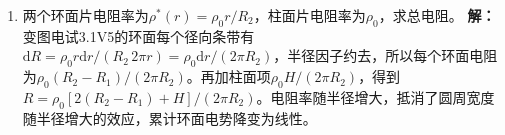 \documentclass[UTF8,fontset=fandol,a4paper,11pt]{ctexart}
\begin{document}
\begin{enumerate}
\item 两个环面片电阻率为$\rho^*(r)=\rho_0r/R_2$，柱面片电阻率为$\rho_0$，求总电阻。
\textbf{解：}变图电试3.1V5的环面每个径向条带有$\mathrm dR=\rho_0r\mathrm dr/(R_2\,2\pi r)=\rho_0\mathrm dr/(2\pi R_2)$，半径因子约去，所以每个环面电阻为$\rho_0(R_2-R_1)/(2\pi R_2)$。再加柱面项$\rho_0H/(2\pi R_2)$，得到$R=\rho_0[2(R_2-R_1)+H]/(2\pi R_2)$。电阻率随半径增大，抵消了圆周宽度随半径增大的效应，累计环面电势降变为线性。
\begin{center}\begin{minipage}{.98\linewidth}\centering
{}
\end{minipage}
\end{center}
\end{enumerate}
\end{document}
